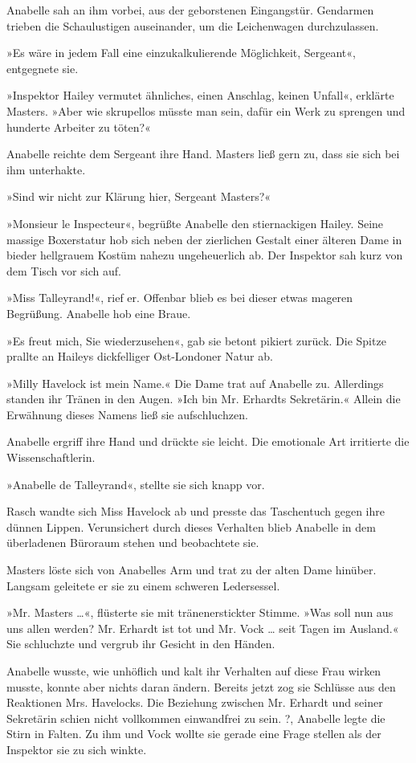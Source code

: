 Anabelle sah an ihm vorbei, aus der geborstenen Eingangstür.
Gendarmen trieben die Schaulustigen auseinander, um die
Leichenwagen durchzulassen.

»Es wäre in jedem Fall eine einzukalkulierende Möglichkeit,
Sergeant«, entgegnete sie.

»Inspektor Hailey vermutet ähnliches, einen Anschlag, keinen
Unfall«, erklärte Masters. »Aber wie skrupellos müsste man sein,
dafür ein Werk zu sprengen und hunderte Arbeiter zu töten?«

Anabelle reichte dem Sergeant ihre Hand. Masters ließ gern zu, dass
sie sich bei ihm unterhakte.

»Sind wir nicht zur Klärung hier, Sergeant Masters?«

\tb

»Monsieur le Inspecteur«, begrüßte Anabelle den stiernackigen
Hailey. Seine massige Boxerstatur hob sich neben der zierlichen
Gestalt einer älteren Dame in bieder hellgrauem Kostüm nahezu
ungeheuerlich ab. Der Inspektor sah kurz von dem Tisch vor sich
auf.

»Miss Talleyrand!«, rief er. Offenbar blieb es bei dieser etwas
mageren Begrüßung. Anabelle hob eine Braue.

»Es freut mich, Sie wiederzusehen«, gab sie betont pikiert zurück.
Die Spitze prallte an Haileys dickfelliger Ost-Londoner Natur ab.

»Milly Havelock ist mein Name.« Die Dame trat auf Anabelle zu.
Allerdings standen ihr Tränen in den Augen. »Ich bin Mr. Erhardts
Sekretärin.« Allein die Erwähnung dieses Namens ließ sie
aufschluchzen.

Anabelle ergriff ihre Hand und drückte sie leicht. Die emotionale
Art irritierte die Wissenschaftlerin.

»Anabelle de Talleyrand«, stellte sie sich knapp vor.

Rasch wandte sich Miss Havelock ab und presste das Taschentuch
gegen ihre dünnen Lippen. Verunsichert durch dieses Verhalten blieb
Anabelle in dem überladenen Büroraum stehen und beobachtete sie.

Masters löste sich von Anabelles Arm und trat zu der alten Dame
hinüber. Langsam geleitete er sie zu einem schweren Ledersessel.

»Mr. Masters …«, flüsterte sie mit tränenerstickter Stimme. »Was
soll nun aus uns allen werden? Mr. Erhardt ist tot und Mr. Vock …
seit Tagen im Ausland.« Sie schluchzte und vergrub ihr Gesicht in
den Händen.

Anabelle wusste, wie unhöflich und kalt ihr Verhalten auf diese
Frau wirken musste, konnte aber nichts daran ändern. Bereits jetzt
zog sie Schlüsse aus den Reaktionen Mrs. Havelocks. Die Beziehung
zwischen Mr. Erhardt und seiner Sekretärin schien nicht vollkommen
einwandfrei zu sein. ?, Anabelle legte die Stirn in
Falten. Zu ihm und Vock wollte sie gerade eine Frage stellen als
der Inspektor sie zu sich winkte.

